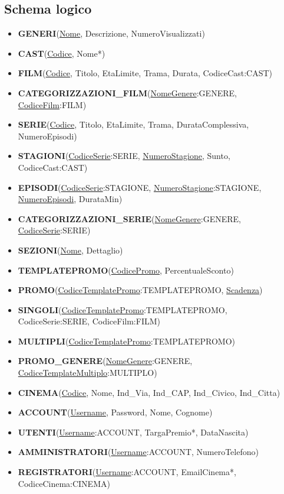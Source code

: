 \documentclass[a4paper,12pt]{report}
\begin{document}
\subsection{Schema logico}
\begin{itemize} %
	\item \textbf{GENERI}(\underline{Nome}, Descrizione, NumeroVisualizzati)
	
	\item \textbf{CAST}(\underline{Codice}, Nome*)
	
	\item \textbf{FILM}(\underline{Codice}, Titolo, EtaLimite, Trama, Durata, CodiceCast:CAST)
	\item \textbf{CATEGORIZZAZIONI{\_}FILM}(\underline{NomeGenere}:GENERE, \underline{CodiceFilm}:FILM)
	
	\item \textbf{SERIE}(\underline{Codice}, Titolo, EtaLimite, Trama, DurataComplessiva, NumeroEpisodi)
	\item \textbf{STAGIONI}(\underline{CodiceSerie}:SERIE, \underline{NumeroStagione}, Sunto, CodiceCast:CAST)
	\item \textbf{EPISODI}(\underline{CodiceSerie}:STAGIONE, \underline{NumeroStagione}:STAGIONE, \underline{NumeroEpisodi}, DurataMin)
	\item \textbf{CATEGORIZZAZIONI{\_}SERIE}(\underline{NomeGenere}:GENERE, \underline{CodiceSerie}:SERIE)
	
	\item \textbf{SEZIONI}(\underline{Nome}, Dettaglio)
	
	\item \textbf{TEMPLATEPROMO}(\underline{CodicePromo}, PercentualeSconto)
	\item \textbf{PROMO}(\underline{CodiceTemplatePromo}:TEMPLATEPROMO, \underline{Scadenza})
	\item \textbf{SINGOLI}(\underline{CodiceTemplatePromo}:TEMPLATEPROMO, CodiceSerie:SERIE, CodiceFilm:FILM)
	\item \textbf{MULTIPLI}(\underline{CodiceTemplatePromo}:TEMPLATEPROMO)
	\item \textbf{PROMO{\_}GENERE}(\underline{NomeGenere}:GENERE, \underline{CodiceTemplateMultiplo}:MULTIPLO)
	
	\item \textbf{CINEMA}(\underline{Codice}, Nome, Ind{\_}Via, Ind{\_}CAP, Ind{\_}Civico, Ind{\_}Citta)
	
	\item \textbf{ACCOUNT}(\underline{Username}, Password, Nome, Cognome)
	\item \textbf{UTENTI}(\underline{Username}:ACCOUNT, TargaPremio*, DataNascita)
	\item \textbf{AMMINISTRATORI}(\underline{Username}:ACCOUNT, NumeroTelefono)
	\item \textbf{REGISTRATORI}(\underline{Username}:ACCOUNT, EmailCinema*, CodiceCinema:CINEMA)
	

\end{itemize}
\end{document}
